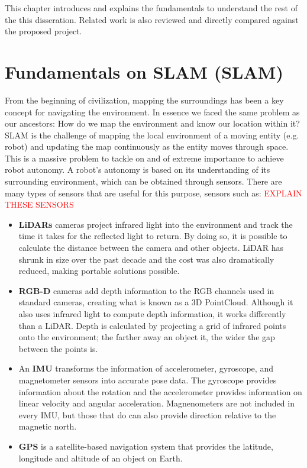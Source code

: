 This chapter introduces and explains the fundamentals to understand the rest of the this disseration. Related work is also reviewed and directly compared against the proposed project.

\section{Fundamentals on \acl*{SLAM} (\acs*{SLAM})}

From the beginning of civilization, mapping the surroundings has been a key concept for navigating the environment. In essence we faced the same problem as our ancestors: How do we map the environment and know our location within it? \acs*{SLAM} is the challenge of mapping the local environment of a moving entity (e.g. robot) and updating the map continuously as the entity moves through space. This is a massive problem to tackle on and of extreme importance to achieve robot autonomy. A robot's autonomy is based on its understanding of its surrounding environment, which can be obtained through sensors. There are many types of sensors that are useful for this purpose, sensors such as:
\textcolor{red}{EXPLAIN THESE SENSORS}
\begin{itemize}
    \item \textbf{\acs*{LiDAR}s} cameras project infrared light into the environment and track the time it takes for the reflected light to return. By doing so, it is possible to calculate the distance between the camera and other objects. \acs*{LiDAR} has shrunk in size over the past decade and the cost was also dramatically reduced, making portable solutions possible.
    \item \textbf{RGB-D} cameras add depth information to the RGB channels used in standard cameras, creating what is known as a 3D PointCloud. Although it also uses infrared light to compute depth information, it works differently than a \acs*{LiDAR}. Depth is calculated by projecting a grid of infrared points onto the environment; the farther away an object it, the wider the gap between the points is.
    \item An \textbf{\acs*{IMU}} transforms the information of accelerometer, gyroscope, and magnetometer sensors into accurate pose data. The gyroscope provides information about the rotation and the accelerometer provides information on linear velocity and angular acceleration. Magnenometers are not included in every \acs*{IMU}, but those that do can also provide direction relative to the magnetic north.
    \item \textbf{\acs*{GPS}} is a satellite-based navigation system that provides the latitude, longitude and altitude of an object on Earth.
\end{itemize}

